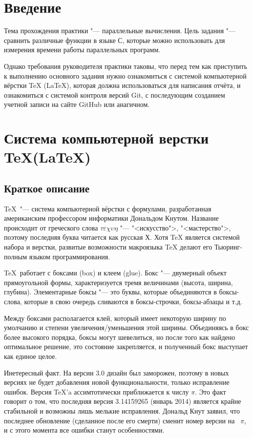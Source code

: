 \documentclass{article}
\begin{document}
	\section{Введение}
	\indent 
		Тема прохождения практики "--- параллельные вычисления. Цель задания "--- сравнить различные функции в языке С, которые 		можно использовать для измерения времени работы параллельных программ.
		
		Однако требования руководителя практики таковы, что перед тем как приступить к выполнению основного задания нужно 				ознакомиться с системой компьютерной вёрстки TeX (LaTeX), которая должна
	использоваться для написания отчёта, и ознакомиться с системой контроля версий Git, с последующим созданием учетной записи на 	сайте GitHub или анагичном.
	\newpage
	\section{Система компьютерной верстки \TeX(\LaTeX)}	
		\subsection{Краткое описание}
			\TeX ~"--- система компьютерной вёрстки с формулами, разработанная американским профессором информатики Дональдом 				Кнутом. Название происходит от греческого слова $\tau\varepsilon\chi\upsilon\eta$ "--- "<искусство">, "<мастерство">, 				поэтому	последняя буква читается как русская Х. Хотя TeX является системой набора и верстки, развитые возможности 					макроязыка TeX делают его Тьюринг-полным языком программирования. 
		
			\TeX ~работает с боксами (box) и клеем (glue). Бокс "--- двумерный объект прямоугольной формы, характеризуется тремя 
		величинами (высота, ширина, глубина). Элементарные боксы "--- это буквы, которые объединяются в боксы-слова, которые в 				свою очередь сливаются в боксы-строчки, боксы-абзацы и т.д.

        	Между боксами располагается клей, который имеет некоторую ширину по умолчанию и степени увеличения/уменьшения этой 				ширины. Объединяясь в бокс более высокого порядка, боксы могут шевелиться, но после того как найдено оптимальное решение, 		это состояние закрепляется, и полученный бокс выступает как единое целое.
        
       		Инетересный факт. На версии 3.0 дизайн был заморожен, поэтому в новых версиях не будет добавления новой 						функциональности, только исправление ошибок. Версия \TeX 'a ассимтотически приближается к числу $\pi$. Это факт говорит о 		том, что последняя версия	3.14159265 (январь 2014) является крайне стабильной и возможны лишь мелькие исправления. 				Дональд Кнут заявил, что последнее обновление (сделанное после его смерти) сменит номер версии на ~$\pi$, и с этого 				момента все ошибки станут особенностями.
        		
\end{document}
